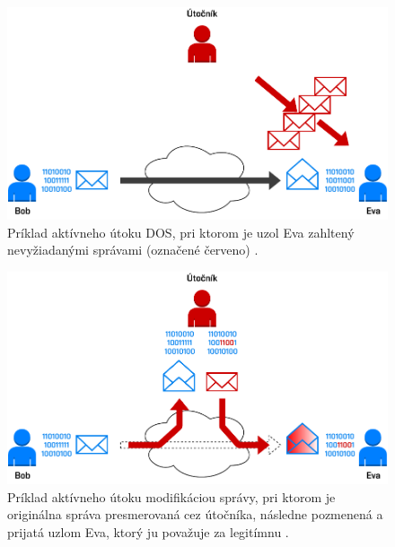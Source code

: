 \begin{figure}[H]
	\begin{center}
		\includegraphics[scale=0.55]{obrazky/active-attack-dos.pdf}
	\end{center}
	\caption[Aktívny útok DOS]{Príklad aktívneho útoku DOS, pri ktorom je uzol Eva zahltený nevyžiadanými správami (označené červeno) \cite{Stallings2011}.}
	\label{active-attack-dos}
\end{figure}

\begin{figure}[H]
	\begin{center}
		\includegraphics[scale=0.55]{obrazky/active-attack-mod.pdf}
	\end{center}
	\caption[Aktívny útok modifikácia správy]{Príklad aktívneho útoku modifikáciou správy, pri ktorom je originálna správa presmerovaná cez útočníka, následne pozmenená a prijatá uzlom Eva, ktorý ju považuje za legitímnu \cite{Stallings2011}.}
	\label{active-attack-mod}	
\end{figure}

